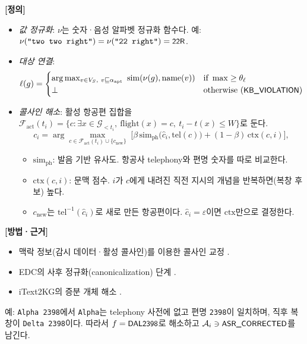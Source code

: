 \documentclass[10pt,a4paper]{article}
\newcommand{\G}{\mathcal{G}}
\newcommand{\cmd}[1]{\textsf{\small #1}}
\begin{document}
\textbf{[정의]}
\begin{itemize}
\item \emph{값 정규화}: $\nu$는 숫자·음성 알파벳 정규화 함수다. 예: $\nu(\texttt{"two two right"}) = \nu(\texttt{"22 right"}) = \cmd{22R}$.
\item \emph{대상 연결}:
\begin{equation}
\ell(g) = \begin{cases}\arg\max_{v\in V_S,\ v\sqsubseteq \alpha_{\mathrm{apt}}}\ \mathrm{sim}(\nu(g), \mathrm{name}(v)) & \text{if } \max \ge \theta_\ell\\ \bot & \text{otherwise (}\cmd{KB\_VIOLATION}\text{)}\end{cases}
\end{equation}
\item \emph{콜사인 해소}: 활성 항공편 집합을 $\mathcal{F}_{\mathrm{act}}(t_i) = \{c : \exists x\in\G_{<t_i},\ \mathrm{flight}(x)=c,\ t_i - t(x) \le W\}$로 둔다.
\begin{equation}
c_i = \arg\max_{c\in\mathcal{F}_{\mathrm{act}}(t_i)\cup\{c_{\mathrm{new}}\}}\;\Big[\beta\,\mathrm{sim}_{\mathrm{ph}}\big(\hat c_i, \mathrm{tel}(c)\big) + (1-\beta)\,\mathrm{ctx}(c, i)\Big],
\end{equation}
  \begin{itemize}
  \item $\mathrm{sim}_{\mathrm{ph}}$: 발음 기반 유사도. 항공사 telephony와 편명 숫자를 따로 비교한다.
  \item $\mathrm{ctx}(c,i)$: 문맥 점수. $i$가 $c$에게 내려진 직전 지시의 개념을 반복하면(복창 후보) 높다.
  \item $c_{\mathrm{new}}$는 $\mathrm{tel}^{-1}(\hat c_i)$로 새로 만든 항공편이다. $\hat c_i=\varepsilon$이면 $\mathrm{ctx}$만으로 결정한다.
  \end{itemize}
\end{itemize}

\textbf{[방법·근거]}
\begin{itemize}
\item 맥락 정보(감시 데이터·활성 콜사인)를 이용한 콜사인 교정 \cite{nigmatulina2022,helmke2021}.
\item EDC의 사후 정규화(canonicalization) 단계 \cite{edc2024}.
\item iText2KG의 증분 개체 해소 \cite{itext2kg}.
\end{itemize}
예: \texttt{Alpha 2398}에서 \texttt{Alpha}는 telephony 사전에 없고 편명 \texttt{2398}이 일치하며, 직후 복창이 \texttt{Delta 2398}이다. 따라서 $f=\cmd{DAL2398}$로 해소하고 $\mathcal{A}_i \ni \cmd{ASR\_CORRECTED}$를 남긴다.
\end{document}
